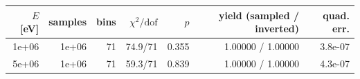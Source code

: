 \begin{tabular}{rrrrrrr}
\toprule
$E$ [eV] & samples & bins & $\chi^2/\mathrm{dof}$ & $p$ & yield (sampled / inverted) & quad. err. \\
\midrule
1e+06 & 1e+06 & 71 & 74.9/71 & 0.355 & 1.00000 / 1.00000 & 3.8e-07 \\
5e+06 & 1e+06 & 71 & 59.3/71 & 0.839 & 1.00000 / 1.00000 & 4.3e-07 \\
\bottomrule
\end{tabular}
